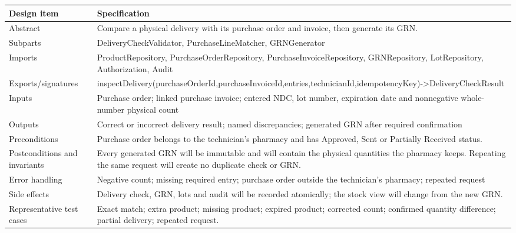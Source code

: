 {\def\LTcaptype{none} %
\begin{longtable}[]{|
  >{\raggedright\arraybackslash}m{}|
  >{\raggedright\arraybackslash}m{}|}
\hline
\begin{minipage}[c]{\linewidth}\raggedright
\textbf{Design item}
\end{minipage} & \begin{minipage}[c]{\linewidth}\raggedright
\textbf{Specification}
\end{minipage} \\
\hline
\endhead

\endlastfoot
Abstract & Compare a physical delivery with its purchase order and invoice, then generate its GRN. \\ \hline
Subparts & DeliveryCheckValidator, PurchaseLineMatcher, GRNGenerator \\ \hline
Imports & ProductRepository, PurchaseOrderRepository, PurchaseInvoiceRepository, GRNRepository, LotRepository, Authorization, Audit \\ \hline
Exports/signatures & inspectDelivery(purchaseOrderId,purchaseInvoiceId,\newline entries,technicianId,idempotencyKey)-\textgreater DeliveryCheckResult \\ \hline
Inputs & Purchase order; linked purchase invoice; entered NDC, lot number, expiration date and nonnegative whole-number physical count \\ \hline
Outputs & Correct or incorrect delivery result; named discrepancies; generated GRN after required confirmation \\ \hline
Preconditions & Purchase order belongs to the technician's pharmacy and has Approved, Sent or Partially Received status. \\ \hline
Postconditions and invariants & Every generated GRN will be immutable and will contain the physical quantities the pharmacy keeps. Repeating the same request will create no duplicate check or GRN. \\ \hline
Error handling & Negative count; missing required entry; purchase order outside the technician's pharmacy; repeated request \\ \hline
Side effects & Delivery check, GRN, lots and audit will be recorded atomically; the stock view will change from the new GRN. \\ \hline
Representative test cases & Exact match; extra product; missing product; expired product; corrected count; confirmed quantity difference; partial delivery; repeated request. \\ \hline
\end{longtable}
}

